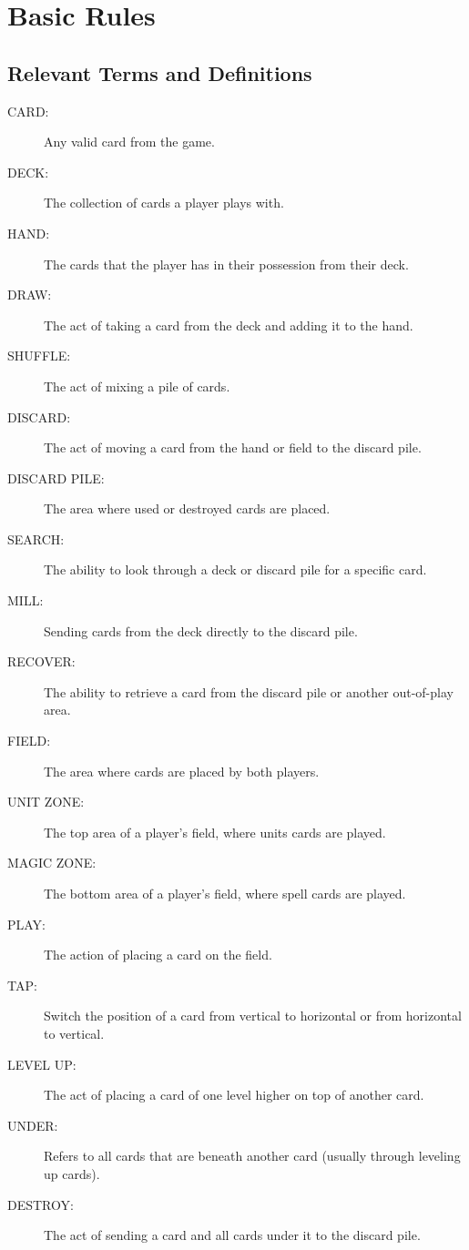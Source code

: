 \chapter{Basic Rules}

\section{Relevant Terms and Definitions}
\begin{description}
    \item[CARD:] Any valid card from the game.
    \item[DECK:] The collection of cards a player plays with.
    \item[HAND:] The cards that the player has in their possession from their deck.
    \item[DRAW:] The act of taking a card from the deck and adding it to the hand.
    \item[SHUFFLE:] The act of mixing a pile of cards.
    \item[DISCARD:] The act of moving a card from the hand or field to the discard pile.
    \item[DISCARD PILE:] The area where used or destroyed cards are placed.
    \item[SEARCH:] The ability to look through a deck or discard pile for a specific card.
    \item[MILL:] Sending cards from the deck directly to the discard pile.
    \item[RECOVER:] The ability to retrieve a card from the discard pile or another out-of-play area.
    \item[FIELD:] The area where cards are placed by both players.
    \item[UNIT ZONE:] The top area of a player's field, where units cards are played.
    \item[MAGIC ZONE:] The bottom area of a player's field, where spell cards are played.
    \item[PLAY:] The action of placing a card on the field.
    \item[TAP:] Switch the position of a card from vertical to horizontal or from horizontal to vertical.
    \item[LEVEL UP:] The act of placing a card of one level higher on top of another card.
    \item[UNDER:] Refers to all cards that are beneath another card (usually through leveling up cards).
    \item[DESTROY:] The act of sending a card and all cards under it to the discard pile.

\end{description}
